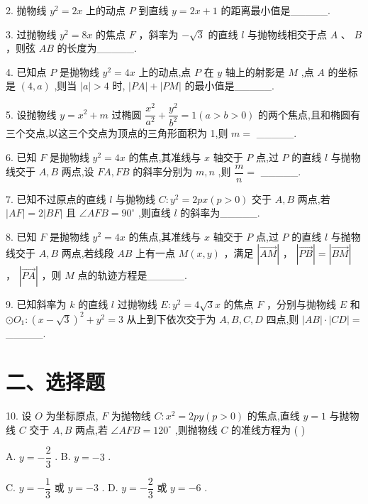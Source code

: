 2. 抛物线 ${y}^{2} = {2x}$ 上的动点 $P$ 到直线 $y = {2x} + 1$ 的距离最小值是\_\_\_\_\_.

3. 过抛物线 ${y}^{2} = {8x}$ 的焦点 $F$ ，斜率为 $- \sqrt{3}$ 的直线 $l$ 与抛物线相交于点 $A$ 、 $B$ ，则弦 ${AB}$ 的长度为\_\_\_\_\_.

4. 已知点 $P$ 是抛物线 ${y}^{2} = {4x}$ 上的动点,点 $P$ 在 $y$ 轴上的射影是 $M$ ,点 $A$ 的坐标是 $\left( {4,a}\right)$ ,则当 $\left| a\right|  > 4$ 时, $\left| {PA}\right|  + \left| {PM}\right|$ 的最小值是\_\_\_\_\_.

5. 设抛物线 $y = {x}^{2} + m$ 过椭圆 $\dfrac{{x}^{2}}{{a}^{2}} + \dfrac{{y}^{2}}{{b}^{2}} = 1\left( {a > b > 0}\right)$ 的两个焦点,且和椭圆有三个交点,以这三个交点为顶点的三角形面积为 1,则 $m =$ \_\_\_\_\_.

6. 已知 $F$ 是抛物线 ${y}^{2} = {4x}$ 的焦点,其准线与 $x$ 轴交于 $P$ 点,过 $P$ 的直线 $l$ 与抛物线交于 $A,B$ 两点,设 ${FA},{FB}$ 的斜率分别为 $m,n$ ,则 $\dfrac{m}{n} =$ \_\_\_\_\_.

7. 已知不过原点的直线 $l$ 与抛物线 $C : {y}^{2} = {2px}\left( {p > 0}\right)$ 交于 $A,B$ 两点,若 $\left| {AF}\right|  = 2\left| {BF}\right|$ 且 $\angle {AFB} =  {90}^{ \circ  }$ ,则直线 $l$ 的斜率为\_\_\_\_\_.

8. 已知 $F$ 是抛物线 ${y}^{2} = {4x}$ 的焦点,其准线与 $x$ 轴交于 $P$ 点,过 $P$ 的直线 $l$ 与抛物线交于 $A,B$ 两点,若线段 ${AB}$ 上有一点 $M\left( {x,y}\right)$ ，满足 $\left| \overrightarrow{AM}\right|$ ， $\left| \overrightarrow{PB}\right|  = \left| \overrightarrow{BM}\right|$ ， $\left| \overrightarrow{PA}\right|$ ，则 $M$ 点的轨迹方程是\_\_\_\_\_.

9. 已知斜率为 $k$ 的直线 $l$ 过抛物线 $E : {y}^{2} = 4\sqrt{3}x$ 的焦点 $F$ ，分别与抛物线 $E$ 和 $\odot  {O}_{1} : {\left( x - \sqrt{3}\right) }^{2} + {y}^{2} = 3$ 从上到下依次交于为 $A,B,C,D$ 四点,则 $\left| {AB}\right|  \cdot  \left| {CD}\right|  =$ \_\_\_\_\_.

\section*{二、选择题}

10. 设 $O$ 为坐标原点, $F$ 为抛物线 $C : {x}^{2} = {2py}\left( {p > 0}\right)$ 的焦点,直线 $y = 1$ 与抛物线 $C$ 交于 $A,B$ 两点,若 $\angle {AFB} = {120}^{ \circ  }$ ,则抛物线 $C$ 的准线方程为 ( )

A. $y =  - \dfrac{2}{3}$ . B. $y =  - 3$ .

C. $y =  - \dfrac{1}{3}$ 或 $y =  - 3$ . D. $y =  - \dfrac{2}{3}$ 或 $y =  - 6$ .

